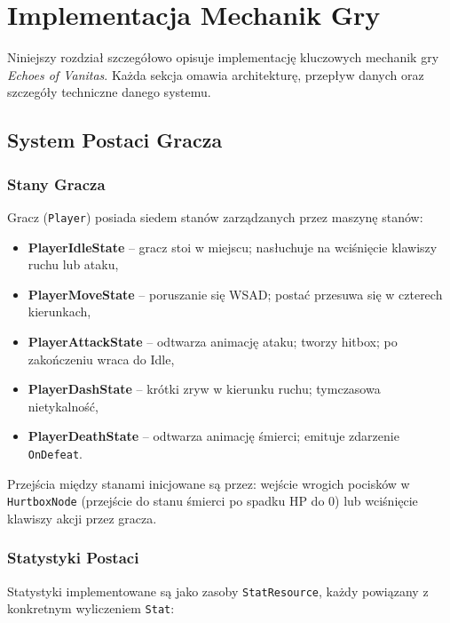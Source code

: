 \chapter{Implementacja Mechanik Gry}

Niniejszy rozdział szczegółowo opisuje implementację kluczowych mechanik gry \textit{Echoes of Vanitas}. Każda sekcja omawia architekturę, przepływ danych oraz szczegóły techniczne danego systemu.

\section{System Postaci Gracza}

\subsection{Stany Gracza}

Gracz (\texttt{Player}) posiada siedem stanów zarządzanych przez maszynę stanów:

\begin{itemize}
    \item \textbf{PlayerIdleState} – gracz stoi w miejscu; nasłuchuje na wciśnięcie klawiszy ruchu lub ataku,
    \item \textbf{PlayerMoveState} – poruszanie się WSAD; postać przesuwa się w czterech kierunkach,
    \item \textbf{PlayerAttackState} – odtwarza animację ataku; tworzy hitbox; po zakończeniu wraca do Idle,
    \item \textbf{PlayerDashState} – krótki zryw w kierunku ruchu; tymczasowa nietykalność,
    \item \textbf{PlayerDeathState} – odtwarza animację śmierci; emituje zdarzenie \texttt{OnDefeat}.
\end{itemize}

Przejścia między stanami inicjowane są przez: wejście wrogich pocisków w \texttt{HurtboxNode} (przejście do stanu śmierci po spadku HP do 0) lub wciśnięcie klawiszy akcji przez gracza.

\subsection{Statystyki Postaci}

Statystyki implementowane są jako zasoby \texttt{StatResource}, każdy powiązany z konkretnym wyliczeniem \texttt{Stat}:

